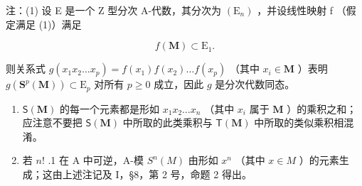 注：(1) 设 E 是一个 Z 型分次 A-代数，其分次为 \((\mathrm{E}_{n})\) ，并设线性映射 f （假定满足 (1)）满足

\[
f (\mathbf {M}) \subset \mathrm{E} _ {1}.\tag{2}
\]

则关系式 \(g(x_1x_2 \ldots x_p) = f(x_1)f(x_2) \ldots f(x_p)\) （其中 \(x_i \in \mathbf{M}\) ）表明 \(g(\mathbf{S}^p(\mathbf{M})) \subset \mathrm{E}_p\) 对所有 \(p \geqslant 0\) 成立，因此 \(g\) 是分次代数同态。

\begin{enumerate}
\def\labelenumi{(\arabic{enumi})}
\setcounter{enumi}{1}
\item
  \(\mathsf{S}(\mathbf{M})\) 的每一个元素都是形如 \(x_{1}x_{2}\ldots x_{n}\) （其中 \(x_{i}\) 属于 \(\mathbf{M}\) ）的乘积之和；应注意不要把 \(\mathsf{S}(\mathbf{M})\) 中所取的此类乘积与 \(\mathsf{T}(\mathbf{M})\) 中所取的类似乘积相混淆。
\item
  若 \(n!\) .1 在 A 中可逆，A-模 \(S^n(M)\) 由形如 \(x^n\) （其中 \(x \in M\) ）的元素生成；这由上述注记及 I，§8，第 2 号，命题 2 得出。
\end{enumerate}

